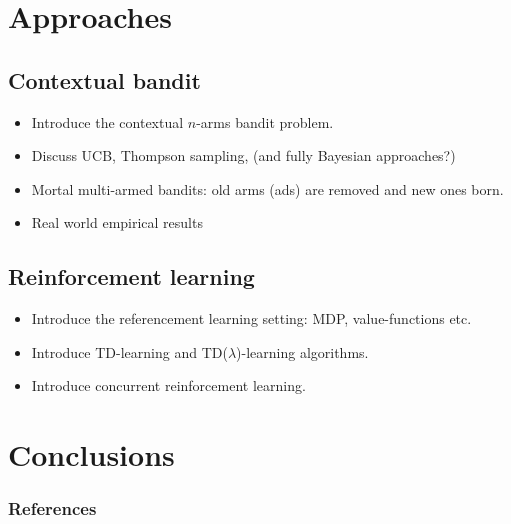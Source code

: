 \documentclass{article} %
\begin{document}
\section{Approaches}

\subsection{Contextual bandit}

\begin{itemize}
  \item{Introduce the contextual $n$-arms bandit problem.}
  \item{Discuss UCB, Thompson sampling, (and fully Bayesian approaches?)}
  \item{Mortal multi-armed bandits: old arms (ads) are removed and new ones
    born.}
  \item{Real world empirical results}
\end{itemize}

\subsection{Reinforcement learning}

\begin{itemize}
  \item{Introduce the referencement learning setting: MDP, value-functions
    etc.}
  \item{Introduce TD-learning and TD($\lambda$)-learning algorithms.}
  \item{Introduce concurrent reinforcement learning.}
\end{itemize}

\section{Conclusions}

\subsubsection*{References}
\nocite{*}

\printbibliography[heading=none]
\end{document}
